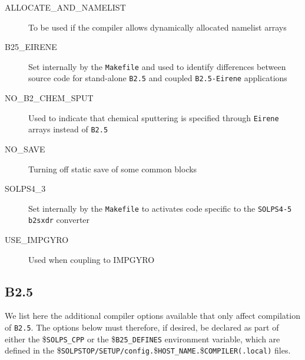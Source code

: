 \documentclass[a4paper,10pt]{report}
\begin{document}
\begin{description}
\item[ALLOCATE\_AND\_NAMELIST]  To be used if the compiler allows dynamically allocated namelist arrays
\item[B25\_EIRENE]  Set internally by the {\tt Makefile} and used to identify differences between source code for stand-alone {\tt B2.5} and coupled {\tt B2.5-Eirene} applications
\item[NO\_B2\_CHEM\_SPUT]  Used to indicate that chemical sputtering is specified through {\tt Eirene} arrays instead of {\tt B2.5}
\item[NO\_SAVE]  Turning off static save of some common blocks
\item[SOLPS4\_3]  Set internally by the {\tt Makefile} to activates code specific to the {\tt SOLPS4-5 b2sxdr} converter
\item[USE\_IMPGYRO]  Used when coupling to IMPGYRO
\end{description}

\subsection{B2.5}


We list here the additional compiler options available that only affect compilation of
{\tt B2.5}. The options below must therefore,
if desired, be declared as part of either the \${\tt SOLPS\_CPP} or the
\${\tt B25\_DEFINES} environment variable, which are defined in the
\${\tt SOLPSTOP/SETUP/config.}\${\tt {HOST\_NAME}.}\${\tt {COMPILER}(.local)} files.
\end{document}
